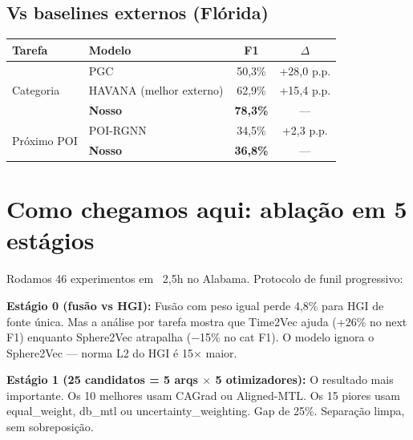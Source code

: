 \documentclass[12pt,a4paper]{article}
\begin{document}
\subsection{Vs baselines externos (Flórida)}

\begin{table}[H]
\centering
\small
\begin{tabular}{llcc}
\toprule
\textbf{Tarefa} & \textbf{Modelo} & \textbf{F1} & \textbf{$\Delta$} \\
\midrule
\multirow{3}{*}{Categoria}
    & PGC & 50,3\% & +28,0 p.p. \\
    & HAVANA (melhor externo) & 62,9\% & +15,4 p.p. \\
    & \textbf{Nosso} & \textbf{78,3\%} & --- \\
\midrule
\multirow{2}{*}{Próximo POI}
    & POI-RGNN & 34,5\% & +2,3 p.p. \\
    & \textbf{Nosso} & \textbf{36,8\%} & --- \\
\bottomrule
\end{tabular}
\end{table}

\section{Como chegamos aqui: ablação em 5 estágios}

Rodamos 46 experimentos em ~2,5h no Alabama. Protocolo de funil progressivo:

\textbf{Estágio 0 (fusão vs HGI):} Fusão com peso igual perde 4,8\% para HGI de fonte única. Mas a análise por tarefa mostra que Time2Vec ajuda (+26\% no next F1) enquanto Sphere2Vec atrapalha ($-$15\% no cat F1). O modelo ignora o Sphere2Vec --- norma L2 do HGI é 15$\times$ maior.

\textbf{Estágio 1 (25 candidatos = 5 arqs $\times$ 5 otimizadores):} O resultado mais importante. Os 10 melhores usam CAGrad ou Aligned-MTL. Os 15 piores usam equal\_weight, db\_mtl ou uncertainty\_weighting. Gap de 25\%. Separação limpa, sem sobreposição.
\end{document}
